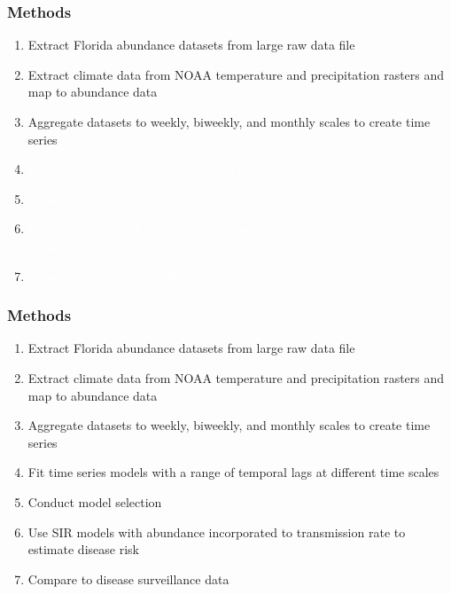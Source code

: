 \documentclass{beamer}
\begin{document}
\begin{frame}{}
	\frametitle{Methods}
	
	\begin{enumerate}
		\item Extract Florida abundance datasets from large raw data file 
		
		\item Extract climate data from NOAA temperature and precipitation rasters and map to abundance data
		
		\item Aggregate datasets to weekly, biweekly, and monthly scales to create time series
		
		\item \textcolor{white}{Fit time series models with a range of temporal lags at different time scales}
		
		\item \textcolor{white}{Conduct model selection}
		
		\item \textcolor{white}{Use SIR models with abundance incorporated to transmission rate to estimate disease risk}
		
		\item \textcolor{white}{Compare to disease surveillance data}
		
	\end{enumerate}
	
\end{frame}

\begin{frame}{}
\frametitle{Methods}

\begin{enumerate}
	\item Extract Florida abundance datasets from large raw data file 
	
	\item Extract climate data from NOAA temperature and precipitation rasters and map to abundance data
	
	\item Aggregate datasets to weekly, biweekly, and monthly scales to create time series
	
	\item Fit time series models with a range of temporal lags at different time scales
	
	\item Conduct model selection 
	
	\item Use SIR models with abundance incorporated to transmission rate to estimate disease risk
	
	\item Compare to disease surveillance data
	
\end{enumerate}

\end{frame}
\end{document}
